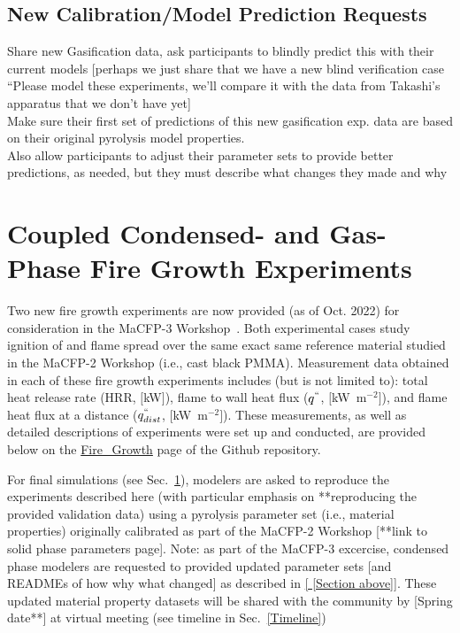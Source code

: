 \documentclass[12pt]{article}
\begin{document}
\clearpage
\subsection{New Calibration/Model Prediction Requests }


Share new Gasification data, ask participants to blindly predict this with their current models [perhaps we just share that we have a new blind verification case “Please model these experiments, we’ll compare it with the data from Takashi’s apparatus that we don’t have yet]\\
Make sure their first set of predictions of this new gasification exp. data are based on their original pyrolysis model properties.\\
Also allow participants to adjust their parameter sets to provide better predictions, as needed, but they must describe what changes they made and why\\

\clearpage
\section{Coupled Condensed- and Gas-Phase Fire Growth Experiments}
Two new fire growth experiments are now provided (as of Oct. 2022) for consideration in the MaCFP-3 Workshop~\cite{chaudhari2021experimental, Leventon2022ParallelPanel}. Both experimental cases study ignition of and flame spread over the same exact same reference material studied in the MaCFP-2 Workshop (i.e., cast black PMMA). Measurement data obtained in each of these fire growth experiments includes (but is not limited to): total heat release rate (HRR, $[$kW$]$), flame to wall heat flux ($q^{``}$, $[$kW~m$^{-2}$$]$), and flame heat flux at a distance ($q^{``}_{dist}$, $[$kW~m$^{-2}$$]$). These measurements, as well as detailed descriptions of experiments were set up and conducted, are provided below on the \href{https://github.com/MaCFP/macfp-db/tree/master/Fire_Growth}{Fire\_Growth} page of the Github repository. 

For final simulations (see Sec.~\ref{}), modelers are asked to reproduce the experiments described here (with particular emphasis on **reproducing the provided validation data) using a pyrolysis parameter set (i.e., material properties) originally calibrated as part of the MaCFP-2 Workshop [**link to solid phase parameters page]. Note: as part of the MaCFP-3 excercise, condensed phase modelers are requested to provided updated parameter sets [and READMEs of how why what changed] as described in \ref{ [Section above]}. These updated material property datasets will be shared with the community by [Spring date**] at virtual meeting (see timeline in Sec.~\ref{Timeline})
\end{document}
